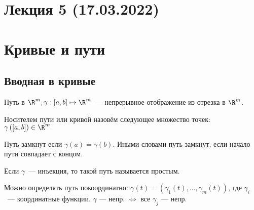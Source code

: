 \section*{Лекция 5 (17.03.2022)}
\section{Кривые и пути}
\subsection{Вводная в кривые}
\begin{definition}
    Путь в $\R^m, \gamma : [a, b] \mapsto \R^m$~--- непрерывное отображение из отрезка в $\R^m$.
\end{definition}
\begin{definition}
    Носителем пути или кривой назовём следующее множество точек: $\gamma\left([a, b]\right)\in \R^m$
\end{definition}
\begin{definition}
    Путь замкнут если $\gamma(a) = \gamma(b)$. Иными словами путь замкнут, если начало пути совпадает с концом.
\end{definition}
\begin{definition}
    Если $\gamma$~--- инъекция, то такой путь называется
    простым.
\end{definition}
\begin{remark}
    Можно определять путь покоординатно:
    $\gamma(t) = (\gamma_1(t),\dots, \gamma_m(t))$, где $\gamma_i$~--- координатные функции.
    $\gamma$ --- непр. $\Longleftrightarrow$ все $\gamma_j$ --- непр.
\end{remark}

